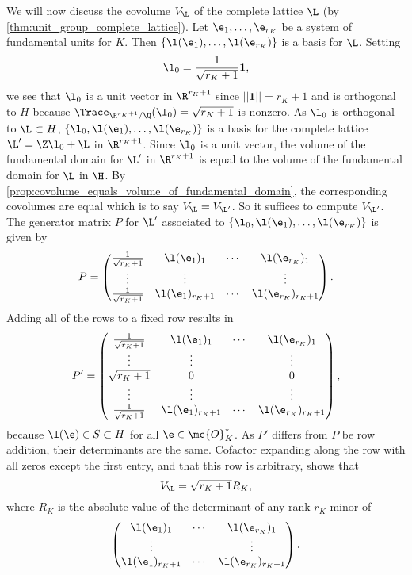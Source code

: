       We will now discuss the covolume $V_{\L}$ of the complete lattice $\L$ (by \cref{thm:unit_group_complete_lattice}). Let $\e_{1},\ldots,\e_{r_{K}}$ be a system of fundamental units for $K$. Then $\{\l(\e_{1}),\ldots,\l(\e_{r_{K}})\}$ is a basis for $\L$. Setting
      \[
        \l_{0} = \frac{1}{\sqrt{r_{K}+1}}\mathbf{1},
      \]
      we see that $\l_{0}$ is a unit vector in $\R^{r_{K}+1}$ since $||\mathbf{1}|| = r_{K}+1$ and is orthogonal to $H$ because $\Trace_{\R^{r_{K}+1}/\Q}(\l_{0}) = \sqrt{r_{K}+1}$ is nonzero. As $\l_{0}$ is orthogonal to $\L \subset H$, $\{\l_{0},\l(\e_{1}),\ldots,\l(\e_{r_{K}})\}$ is a basis for the complete lattice $\L' = \Z\l_{0}+\L$ in $\R^{r_{K}+1}$. Since $\l_{0}$ is a unit vector, the volume of the fundamental domain for $\L'$ in $\R^{r_{K}+1}$ is equal to the volume of the fundamental domain for $\L$ in $\H$. By \cref{prop:covolume_equals_volume_of_fundamental_domain}, the corresponding covolumes are equal which is to say $V_{\L} = V_{\L'}$. So it suffices to compute $V_{\L'}$. The generator matrix $P$ for $\L'$ associated to $\{\l_{0},\l(\e_{1}),\ldots,\l(\e_{r_{K}})\}$ is given by
      \[
        P = \begin{pmatrix} \frac{1}{\sqrt{r_{K}+1}} & \l(\e_{1})_{1} & \cdots & \l(\e_{r_{K}})_{1} \\ \vdots & \vdots & & \vdots \\ \frac{1}{\sqrt{r_{K}+1}} & \l(\e_{1})_{r_{K}+1} & \cdots & \l(\e_{r_{K}})_{r_{K}+1} \end{pmatrix}.
      \]
      Adding all of the rows to a fixed row results in
      \[
        P' = \begin{pmatrix} \frac{1}{\sqrt{r_{K}+1}} & \l(\e_{1})_{1} & \cdots & \l(\e_{r_{K}})_{1} \\ \vdots & \vdots & & \vdots \\ \sqrt{r_{K}+1} & 0 & & 0 \\ \vdots & \vdots & & \vdots \\ \frac{1}{\sqrt{r_{K}+1}} & \l(\e_{1})_{r_{K}+1} & \cdots & \l(\e_{r_{K}})_{r_{K}+1} \end{pmatrix},
      \]
      because $\l(\e) \in S \subset H$ for all $\e \in \mc{O}_{K}^{\ast}$. As $P'$ differs from $P$ be row addition, their determinants are the same. Cofactor expanding along the row with all zeros except the first entry, and that this row is arbitrary, shows that
      \[
        V_{\L} = \sqrt{r_{K}+1}R_{K},
      \]
      where $R_{K}$ is the absolute value of the determinant of any rank $r_{K}$ minor of
      \[
        \begin{pmatrix} \l(\e_{1})_{1} & \cdots & \l(\e_{r_{K}})_{1} \\ \vdots & & \vdots \\ \l(\e_{1})_{r_{K}+1} & \cdots & \l(\e_{r_{K}})_{r_{K}+1}  \end{pmatrix}.
      \]
